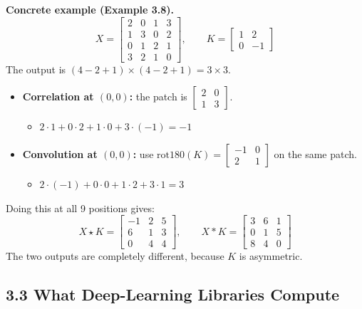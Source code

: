 \textbf{Concrete example (Example 3.8).}
\[
X = \begin{bmatrix} 2 & 0 & 1 & 3 \\ 1 & 3 & 0 & 2 \\ 0 & 1 & 2 & 1 \\ 3 & 2 & 1 & 0 \end{bmatrix},
\qquad
K = \begin{bmatrix} 1 & 2 \\ 0 & -1 \end{bmatrix}
\]
The output is $(4-2+1) \times (4-2+1) = 3 \times 3$.
\begin{itemize}
  \item \textbf{Correlation at $(0,0)$:} the patch is $\begin{bmatrix} 2 & 0 \\ 1 & 3 \end{bmatrix}$.
  \begin{itemize}
    \item $2\cdot 1 + 0\cdot 2 + 1\cdot 0 + 3\cdot(-1) = -1$
  \end{itemize}
  \item \textbf{Convolution at $(0,0)$:} use $\mathrm{rot180}(K) = \begin{bmatrix} -1 & 0 \\ 2 & 1 \end{bmatrix}$ on the same patch.
  \begin{itemize}
    \item $2\cdot(-1) + 0\cdot 0 + 1\cdot 2 + 3\cdot 1 = 3$
  \end{itemize}
\end{itemize}
Doing this at all 9 positions gives:
\[
X \star K = \begin{bmatrix} -1 & 2 & 5 \\ 6 & 1 & 3 \\ 0 & 4 & 4 \end{bmatrix},
\qquad
X * K = \begin{bmatrix} 3 & 6 & 1 \\ 0 & 1 & 5 \\ 8 & 4 & 0 \end{bmatrix}
\]
The two outputs are completely different, because $K$ is asymmetric.


\subsection*{3.3 What Deep-Learning Libraries Compute}

